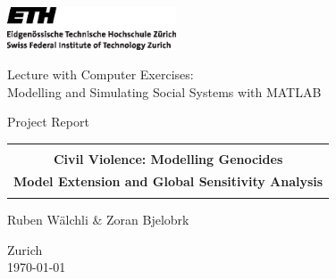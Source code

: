 
\thispagestyle{empty}

\begin{center}
\includegraphics[width=5cm]{ETHlogo.eps}

\bigskip


\bigskip


\bigskip


\LARGE{ 	Lecture with Computer Exercises:\\ }
\LARGE{ Modelling and Simulating Social Systems with MATLAB\\}

\bigskip

\bigskip

\small{Project Report}\\

\bigskip

\bigskip

\bigskip

\bigskip


\begin{tabular}{|c|}
\hline
\\
\textbf{\LARGE{Civil Violence: Modelling Genocides}}\\
\textbf{\LARGE{Model Extension and Global Sensitivity Analysis}}\\
\\
\hline
\end{tabular}
\bigskip

\bigskip

\bigskip

\LARGE{Ruben W\"alchli \& Zoran Bjelobrk}



\bigskip

\bigskip

\bigskip

\bigskip

\bigskip

\bigskip

\bigskip

\bigskip

Zurich\\
\today\\

\end{center}


